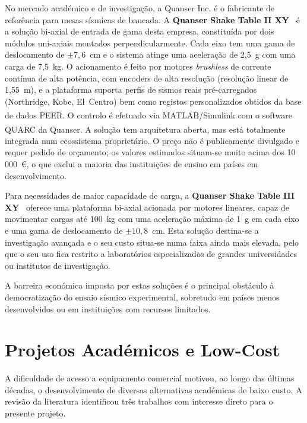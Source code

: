 No mercado académico e de investigação, a Quanser Inc. é o fabricante de referência para mesas sísmicas de bancada. A \textbf{Quanser Shake Table II XY}~\cite{QuanserShakeTableIIXY} é a solução bi-axial de entrada de gama desta empresa, constituída por dois módulos uni-axiais montados perpendicularmente. Cada eixo tem uma gama de deslocamento de $\pm7{,}6$~cm e o sistema atinge uma aceleração de 2,5~g com uma carga de 7,5~kg. O acionamento é feito por motores \textit{brushless} de corrente contínua de alta potência, com encoders de alta resolução (resolução linear de 1,55~\textmu m), e a plataforma suporta perfis de sismos reais pré-carregados (Northridge, Kobe, El~Centro) bem como registos personalizados obtidos da base de dados PEER. O controlo é efetuado via MATLAB\textsuperscript{\textregistered}/Simulink\textsuperscript{\textregistered} com o software QUARC\textsuperscript{\textregistered} da Quanser. A solução tem arquitetura aberta, mas está totalmente integrada num ecossistema proprietário. O preço não é publicamente divulgado e requer pedido de orçamento; os valores estimados situam-se muito acima dos 10\,000~€, o que exclui a maioria das instituições de ensino em países em desenvolvimento.

Para necessidades de maior capacidade de carga, a \textbf{Quanser Shake Table III XY}~\cite{QuanserShakeTableIII} oferece uma plataforma bi-axial acionada por motores lineares, capaz de movimentar cargas até 100~kg com uma aceleração máxima de 1~g em cada eixo e uma gama de deslocamento de $\pm10{,}8$~cm. Esta solução destina-se a investigação avançada e o seu custo situa-se numa faixa ainda mais elevada, pelo que o seu uso fica restrito a laboratórios especializados de grandes universidades ou institutos de investigação.

A barreira económica imposta por estas soluções é o principal obstáculo à democratização do ensaio sísmico experimental, sobretudo em países menos desenvolvidos ou em instituições com recursos limitados.

\section{Projetos Académicos e Low-Cost}
\label{sec:academicos}

A dificuldade de acesso a equipamento comercial motivou, ao longo das últimas décadas, o desenvolvimento de diversas alternativas académicas de baixo custo. A revisão da literatura identificou três trabalhos com interesse direto para o presente projeto.

